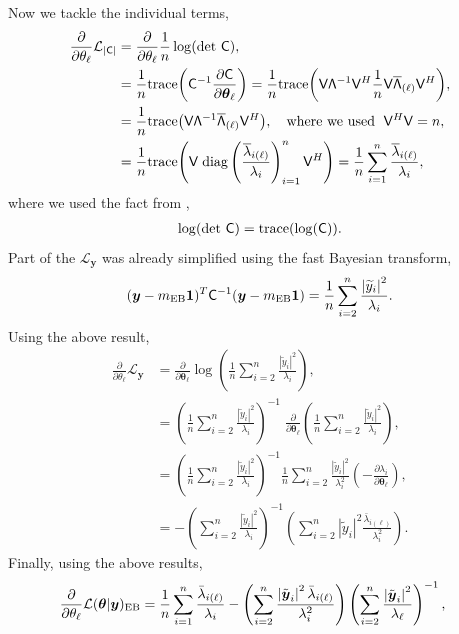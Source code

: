 \documentclass{iitthesis}          %
\newcommand{\bm}[1]{\boldsymbol{#1}}
\newcommand{\trace}[1]{\textup{trace}{#1}}
\newcommand{\vtheta}{{\bm{\theta}}}
\newcommand{\vy}{\bm{y}}
\newcommand{\tvy}{\tilde{\bm{y}}}
\newcommand{\vone}{\bm{1}}
\newcommand{\mC}{\mathsf{C}}
\newcommand{\mCInv}{{\mathsf{C}^{-1}}}
\newcommand{\mLambda}{\mathsf{\Lambda}}
\newcommand{\mV}{\mathsf{V}}
\newcommand{\MLE}{\textup{EB}}
\newcommand{\diag}{\text{diag}}
\def\abs#1{\ensuremath{\left \lvert #1 \right \rvert}}
\begin{document}
Now we tackle the individual terms,
\begin{align*}
\frac{\partial}{\partial \theta_\ell} \mathcal{L}_{\abs{\mC}} &= \frac{\partial}{\partial \theta_\ell}  \frac{1}{n} \log(\det\, \mC) ,
\\ & = \frac 1n \trace{\left( \mCInv \frac{\partial \mC}{\partial \vtheta_\ell} \right)}
= \frac{1}{n}
\trace{\left( \mV {\mLambda}^{-1} \mV^H
	\frac 1n \mV \overline{\mLambda}_{(\ell)} \mV^H
	\right)},
\\
& = \frac{1}{n}
\trace{\left(
	\mV {\mLambda}^{-1}  \overline{\mLambda}_{(\ell)} \mV^H
	\right)}, \quad \text{where we used } \; \mV^H \mV = n,
\\
& =\frac{1}{n}
\trace{\left(
	\mV \;
	\diag\left( \frac{\overline{\lambda}_{i(\ell)}}{\lambda_i} \right)_{i=1}^n \mV^H
	\right)}
= \frac{1}{n} \sum_{i=1}^{n} \frac{\overline{\lambda}_{i(\ell)}}{\lambda_i},
\end{align*}
where we used the fact from \cite{Hig08},
\begin{align*}
\log(\det\, \mC)  = \trace{ (\log( \mC)) }.
\end{align*}
Part of the $\mathcal{L}_{\vy}$ was already simplified using the fast Bayesian transform,
\begin{align*}
{(\vy-m_\MLE\vone)^T\mCInv(\vy-m_\MLE\vone)} = \frac{1}{n} \sum_{i=2}^n \frac{\abs{\widetilde{y}_i}^2}{\lambda_i}.
\end{align*}
Using the above result,
\begin{align*}
\frac{\partial}{\partial \theta_\ell} \mathcal{L}_{\vy} 
&= \frac{\partial}{\partial \vtheta_\ell} \log\left(\frac{1}{n} \sum_{i=2}^n \frac{\abs{\widetilde{y}_i}^2}{\lambda_i} \right) ,
\\ 
&= \left(\frac{1}{n} \sum_{i=2}^n \frac{\abs{\widetilde{y}_i}^2}{\lambda_i}\right)^{-1}
\;
\frac{\partial}{\partial \vtheta_\ell} \left(\frac{1}{n} \sum_{i=2}^n \frac{\abs{\widetilde{y}_i}^2}{\lambda_i} \right) ,
\\ &= \left(
\frac{1}{n} \sum_{i=2}^n \frac{\abs{\widetilde{y}_i}^2}{\lambda_i} \right)^{-1} \frac{1}{n} \sum_{i=2}^n \frac{\abs{\widetilde{y}_i}^2}{\lambda_i^2}
\left( -\frac{\partial \lambda_i}{\partial \vtheta_\ell} \right),
\\ &= -\left(
\sum_{i=2}^n \frac{\abs{\widetilde{y}_i}^2}{\lambda_i} \right)^{-1} 
\left( \sum_{i=2}^n \abs{\widetilde{y}_i}^2 \frac{ \bar{ \lambda}_{i(\ell)} }{\lambda_i^2}
\right).
\end{align*}
Finally, using the above results,
\begin{align}
\label{eqn:deriv_obj_func_MLE}
\frac{\partial}{\partial \theta_\ell} \mathcal{L}(\vtheta | \vy)_{\MLE}
&=  \frac 1n \sum_{i=1}^{n} \frac{\bar{\lambda}_{i(\ell)}}{\lambda_i}
- \left({ \sum_{i=2}^n \frac{\abs{\tvy_i}^2 \bar{\lambda}_{i(\ell)}}{\lambda_i^2}}\right)
\left( {\sum_{i=2}^n \frac{\abs{\tvy_i}^2}{\lambda_\ell}} \right)^{-1},
\end{align}
\end{document}
